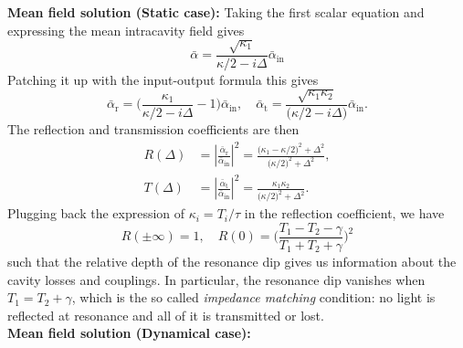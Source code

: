 \noindent \textbf{Mean field solution (Static case): }Taking the first scalar equation and expressing the mean intracavity field gives 
\begin{equation}
  \bar{\alpha} =  \frac{\sqrt{\kappa_1}}{\kappa/2-i\Delta}  \bar{\alpha}_{\mathrm{in}} 
\end{equation}
Patching it up with the input-output formula this gives 
\begin{equation}
  \bar{\alpha}_{\mathrm{r}} =  \Bigg( \frac{\kappa_1}{\kappa/2-i\Delta} - 1 \Bigg)  \bar{\alpha}_{\mathrm{in}}  , \quad   \bar{\alpha}_{\mathrm{t}} =  \frac{\sqrt{\kappa_1 \kappa_2}}{\Big(\kappa/2-i\Delta\Big)} \bar{\alpha}_{\mathrm{in}}.
\end{equation}
The reflection and transmission coefficients are then
\begin{align}
R(\Delta) &= \left|\frac{\bar{\alpha}_{\mathrm{r}}}{\bar{\alpha}_{\mathrm{in}}}\right|^2
= \frac{\bigl(\kappa_1-\kappa/2\bigr)^2+\Delta^2}{\bigl(\kappa/2)^2+\Delta^2},\\[10pt]
T(\Delta) &= \left|\frac{\bar{\alpha}_{\mathrm{t}}}{\bar{\alpha}_{\mathrm{in}}}\right|^2
= \frac{\kappa_1\kappa_2}{\bigl(\kappa/2\bigr)^2+\Delta^2}.
\end{align}
Plugging back the expression of $\kappa_i = T_i/\tau$ in the reflection coefficient, we have 
\begin{equation}
  R(\pm\infty) = 1 , \quad R(0) = \Bigg(\frac{T_1 - T_2 - \gamma}{T_1 + T_2 + \gamma}\Bigg)^2
\end{equation}
such that the relative depth of the resonance dip gives us information about the cavity losses and couplings. In particular, the resonance dip vanishes when $T_1 = T_2 + \gamma$, which is the so called \textit{impedance matching} condition: no light is reflected at resonance and all of it is transmitted or lost. \\ 

\noindent \textbf{Mean field solution (Dynamical case): } \\



